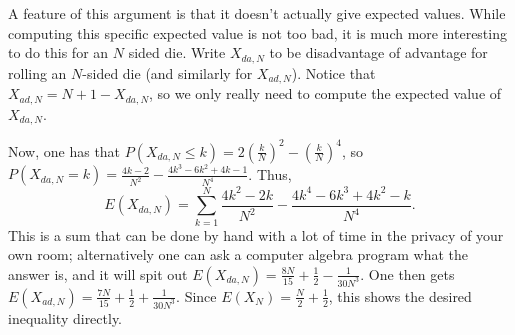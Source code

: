 \documentclass[11pt]{article}
\theoremstyle{definition}
\begin{document}
A feature of this argument is that it doesn't actually give expected values.  While computing this specific expected value is not too bad, it is much more interesting to do this for an $N$ sided die.  Write $X_{da, N}$ to be disadvantage of advantage for rolling an $N$-sided die (and similarly for $X_{ad, N}$).  Notice that $X_{ad, N} = N+1-X_{da, N}$, so we only really need to compute the expected value of $X_{da, N}$.

Now, one has that $P(X_{da, N} \leq k) = 2\left(\frac{k}{N}\right)^2 - \left(\frac{k}{N}\right)^4$, so $P(X_{da, N} = k) = \frac{4k-2}{N^2} - \frac{4k^3-6k^2+4k-1}{N^4}$.  Thus, $$E(X_{da, N}) = \sum_{k = 1}^{N} \frac{4k^2-2k}{N^2} - \frac{4k^4-6k^3+4k^2-k}{N^4}.$$  This is a sum that can be done by hand with a lot of time in the privacy of your own room; alternatively one can ask a computer algebra program what the answer is, and it will spit out $E(X_{da, N}) = \frac{8N}{15} + \frac{1}{2}-\frac{1}{30N^3}.$  One then gets $E(X_{ad, N}) = \frac{7N}{15} + \frac{1}{2} + \frac{1}{30N^3}.$  Since $E(X_N) = \frac{N}{2} + \frac{1}{2}$, this shows the desired inequality directly.
\end{document}
